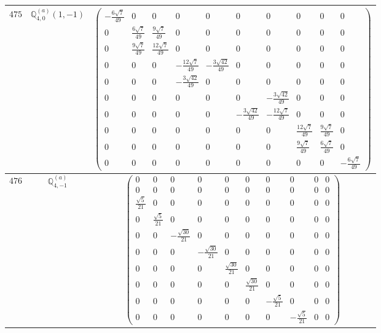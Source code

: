 \documentclass[fleqn,8pt,landscape]{jsarticle}
\begin{document}
\begin{center}
\begin{longtable}{ccc}
$ 475 $ & $ \mathbb{Q}_{4,0}^{(a)}(1,-1) $ & $ \begin{pmatrix} - \frac{6 \sqrt{7}}{49} & 0 & 0 & 0 & 0 & 0 & 0 & 0 & 0 & 0 \\ 0 & \frac{6 \sqrt{7}}{49} & \frac{9 \sqrt{7}}{49} & 0 & 0 & 0 & 0 & 0 & 0 & 0 \\ 0 & \frac{9 \sqrt{7}}{49} & \frac{12 \sqrt{7}}{49} & 0 & 0 & 0 & 0 & 0 & 0 & 0 \\ 0 & 0 & 0 & - \frac{12 \sqrt{7}}{49} & - \frac{3 \sqrt{42}}{49} & 0 & 0 & 0 & 0 & 0 \\ 0 & 0 & 0 & - \frac{3 \sqrt{42}}{49} & 0 & 0 & 0 & 0 & 0 & 0 \\ 0 & 0 & 0 & 0 & 0 & 0 & - \frac{3 \sqrt{42}}{49} & 0 & 0 & 0 \\ 0 & 0 & 0 & 0 & 0 & - \frac{3 \sqrt{42}}{49} & - \frac{12 \sqrt{7}}{49} & 0 & 0 & 0 \\ 0 & 0 & 0 & 0 & 0 & 0 & 0 & \frac{12 \sqrt{7}}{49} & \frac{9 \sqrt{7}}{49} & 0 \\ 0 & 0 & 0 & 0 & 0 & 0 & 0 & \frac{9 \sqrt{7}}{49} & \frac{6 \sqrt{7}}{49} & 0 \\ 0 & 0 & 0 & 0 & 0 & 0 & 0 & 0 & 0 & - \frac{6 \sqrt{7}}{49} \end{pmatrix} $ \\ \hline
$ 476 $ & $ \mathbb{Q}_{4,-1}^{(a)} $ & $ \begin{pmatrix} 0 & 0 & 0 & 0 & 0 & 0 & 0 & 0 & 0 & 0 \\ 0 & 0 & 0 & 0 & 0 & 0 & 0 & 0 & 0 & 0 \\ \frac{\sqrt{5}}{21} & 0 & 0 & 0 & 0 & 0 & 0 & 0 & 0 & 0 \\ 0 & \frac{\sqrt{5}}{21} & 0 & 0 & 0 & 0 & 0 & 0 & 0 & 0 \\ 0 & 0 & - \frac{\sqrt{30}}{21} & 0 & 0 & 0 & 0 & 0 & 0 & 0 \\ 0 & 0 & 0 & - \frac{\sqrt{30}}{21} & 0 & 0 & 0 & 0 & 0 & 0 \\ 0 & 0 & 0 & 0 & \frac{\sqrt{30}}{21} & 0 & 0 & 0 & 0 & 0 \\ 0 & 0 & 0 & 0 & 0 & \frac{\sqrt{30}}{21} & 0 & 0 & 0 & 0 \\ 0 & 0 & 0 & 0 & 0 & 0 & - \frac{\sqrt{5}}{21} & 0 & 0 & 0 \\ 0 & 0 & 0 & 0 & 0 & 0 & 0 & - \frac{\sqrt{5}}{21} & 0 & 0 \end{pmatrix} $ \\ \hline

\end{longtable}
\end{center}
\end{document}
